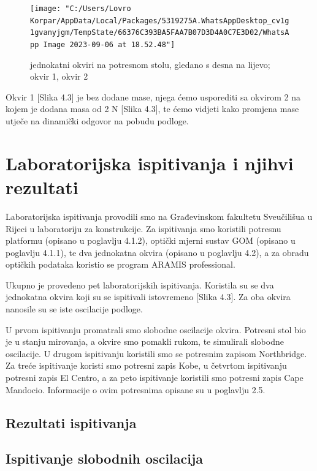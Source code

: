 \documentclass[12pt]{book}
\begin{document}
\begin{figure}[h]
	\centering
	\texttt{[image: "C:/Users/Lovro Korpar/AppData/Local/Packages/5319275A.WhatsAppDesktop\_cv1g1gvanyjgm/TempState/66376C393BA5FAA7B07D3D4A0C7E3D02/WhatsApp Image 2023-09-06 at 18.52.48"]}
	\caption{jednokatni okviri na potresnom stolu, gledano s desna na lijevo; okvir 1, okvir 2}
	\label{fig:whatsapp-image-2023-09-06-at-18}
\end{figure}

Okvir 1 [Slika 4.3] je bez dodane mase, njega ćemo usporediti sa okvirom 2 na kojem je dodana masa od 2 N [Slika 4.3], te ćemo vidjeti kako promjena mase utječe na dinamički odgovor na pobudu podloge.

\chapter{Laboratorijska ispitivanja i njihvi rezultati}

Laboratorijska ispitivanja provodili smo na Građevinskom fakultetu Sveučilišua u Rijeci u laboratoriju za konstrukcije. Za ispitivanja smo koristili potresnu platformu (opisano u poglavlju 4.1.2), optički mjerni sustav GOM (opisano u poglavlju 4.1.1), te dva jednokatna okvira (opisano u poglavlju 4.2), a za obradu optičkih podataka koristio se program ARAMIS professional.

Ukupno je provedeno pet laboratorijskih ispitivanja. Koristila su se dva jednokatna okvira koji su se ispitivali istovremeno [Slika 4.3]. Za oba okvira nanosile su se iste oscilacije podloge. 

U prvom ispitivanju promatrali smo slobodne oscilacije okvira. Potresni stol bio je u stanju mirovanja, a okvire smo pomakli rukom, te simulirali slobodne oscilacije. U drugom ispitivanju koristili smo se potresnim zapisom Northbridge. Za treće ispitivanje koristi smo potresni zapis Kobe, u četvrtom ispitivanju potresni zapis El Centro, a za peto ispitivanje koristili smo potresni zapis Cape Mandocio. Informacije o ovim potresnima opisane su u poglavlju 2.5.

\section{Rezultati ispitivanja}

\section{Ispitivanje slobodnih oscilacija}
\end{document}
